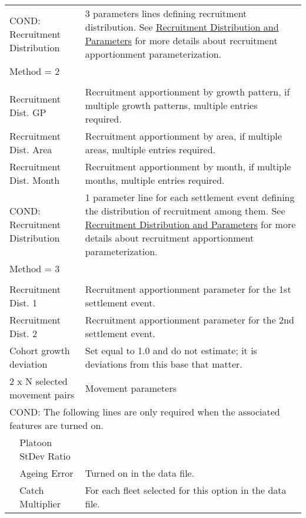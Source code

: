 \begin{longtable}{p{1cm} p{2.25cm} p{10cm}}
	\multicolumn{2}{l}{COND: Recruitment Distribution} \Tstrut & 3 parameters lines defining recruitment distribution. See \hyperlink{recdist}{Recruitment Distribution and Parameters} for more details about recruitment apportionment parameterization. \\
	\multicolumn{2}{l}{ Method = 2} \Tstrut & \\
	& & \\
	\multicolumn{2}{l}{Recruitment Dist. GP} \Tstrut & Recruitment apportionment by growth pattern, if multiple growth patterns, multiple entries required. \\
	\multicolumn{2}{l}{Recruitment Dist. Area} & Recruitment apportionment by area, if multiple areas, multiple entries required. \\
	\multicolumn{2}{l}{Recruitment Dist. Month} & Recruitment apportionment by month, if multiple months, multiple entries required. \Bstrut\\
	\hline

	\multicolumn{2}{l}{COND: Recruitment Distribution} \Tstrut & 1 parameter line for each settlement event defining the distribution of recruitment among them. See \hyperlink{recdist}{Recruitment Distribution and Parameters} for more details about recruitment apportionment parameterization. \\
	\multicolumn{2}{l}{Method = 3} \Tstrut & \\
	& & \\
	\multicolumn{2}{l}{Recruitment Dist. 1} \Tstrut & Recruitment apportionment parameter for the 1st settlement event. \\
	\multicolumn{2}{l}{Recruitment Dist. 2} & Recruitment apportionment parameter for the 2nd settlement event. \Bstrut\\
	\hline

	\multicolumn{2}{l}{Cohort growth deviation} \Tstrut & Set equal to 1.0 and do not estimate; it is deviations from this base that matter. \Bstrut\\
	\hline

	\multicolumn{2}{l}{2 x N selected movement pairs} & Movement parameters \Tstrut\Bstrut\\
	\hline

	\multicolumn{3}{l}{COND: The following lines are only required when the associated features are turned on.} \Tstrut\\
	& Platoon StDev Ratio & \\
	& Ageing Error & Turned on in the data file. \\
	& Catch Multiplier & For each fleet selected for this option in the data file. \\
	\hline


\end{longtable}
